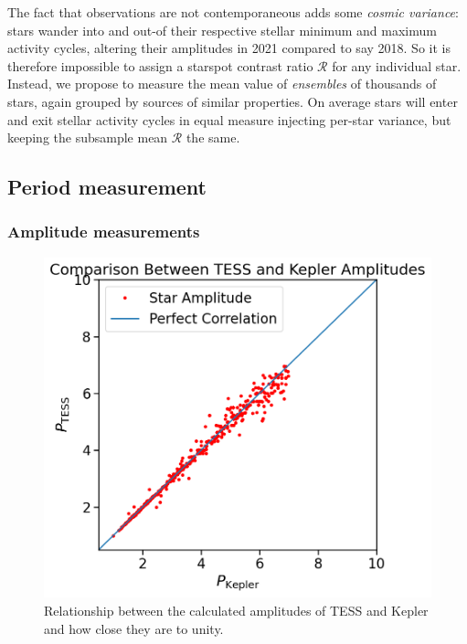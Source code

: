 \documentclass[modern]{aastex631}
\begin{document}
The fact that observations are not contemporaneous adds some \emph{cosmic variance}: stars wander into and out-of their respective stellar minimum and maximum activity cycles, altering their amplitudes in 2021 compared to say 2018. So it is therefore impossible to assign a starspot contrast ratio $\mathcal{R}$ for any individual star.  Instead, we propose to measure the mean value of \emph{ensembles} of thousands of stars, again grouped by sources of similar properties.  On average stars will enter and exit stellar activity cycles in equal measure injecting per-star variance, but keeping the subsample mean $\mathcal{R}$ the same.

\subsection{Period measurement}


\subsubsection{Amplitude measurements}


\begin{figure}[!htb]
  \centering
  \includegraphics[scale=0.5]{Comparison Between TESS and Kepler Amplitudes.png}
  \caption{Relationship between the calculated amplitudes of TESS and Kepler and how close they are to unity.}
\end{figure}
\FloatBarrier
\end{document}
